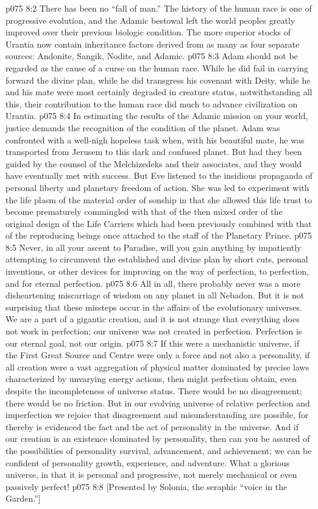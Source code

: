 \vs p075 8:2 There has been no “fall of man.” The history of the human race is one of progressive evolution, and the Adamic bestowal left the world peoples greatly improved over their previous biologic condition. The more superior stocks of Urantia now contain inheritance factors derived from as many as four separate sources: Andonite, Sangik, Nodite, and Adamic.
\vs p075 8:3 Adam should not be regarded as the cause of a curse on the human race. While he did fail in carrying forward the divine plan, while he did transgress his covenant with Deity, while he and his mate were most certainly degraded in creature status, notwithstanding all this, their contribution to the human race did much to advance civilization on Urantia.
\vs p075 8:4 \pc In estimating the results of the Adamic mission on your world, justice demands the recognition of the condition of the planet. Adam was confronted with a well\hyp{}nigh hopeless task when, with his beautiful mate, he was transported from Jerusem to this dark and confused planet. But had they been guided by the counsel of the Melchizedeks and their associates, and  they would have eventually met with success. But Eve listened to the insidious propaganda of personal liberty and planetary freedom of action. She was led to experiment with the life plasm of the material order of sonship in that she allowed this life trust to become prematurely commingled with that of the then mixed order of the original design of the Life Carriers which had been previously combined with that of the reproducing beings once attached to the staff of the Planetary Prince.
\vs p075 8:5 Never, in all your ascent to Paradise, will you gain anything by impatiently attempting to circumvent the established and divine plan by short cuts, personal inventions, or other devices for improving on the way of perfection, to perfection, and for eternal perfection.
\vs p075 8:6 \pc All in all, there probably never was a more disheartening miscarriage of wisdom on any planet in all Nebadon. But it is not surprising that these missteps occur in the affairs of the evolutionary universes. We are a part of a gigantic creation, and it is not strange that everything does not work in perfection; our universe was not created in perfection. Perfection is our eternal goal, not our origin.
\vs p075 8:7 If this were a mechanistic universe, if the First Great Source and Centre were only a force and not also a personality, if all creation were a vast aggregation of physical matter dominated by precise laws characterized by unvarying energy actions, then might perfection obtain, even despite the incompleteness of universe status. There would be no disagreement; there would be no friction. But in our evolving universe of relative perfection and imperfection we rejoice that disagreement and misunderstanding are possible, for thereby is evidenced the fact and the act of personality in the universe. And if our creation is an existence dominated by personality, then can you be assured of the possibilities of personality survival, advancement, and achievement; we can be confident of personality growth, experience, and adventure. What a glorious universe, in that it is personal and progressive, not merely mechanical or even passively perfect!
\vsetoff
\vs p075 8:8 [Presented by Solonia, the seraphic “voice in the Garden.”]
\quizlink
